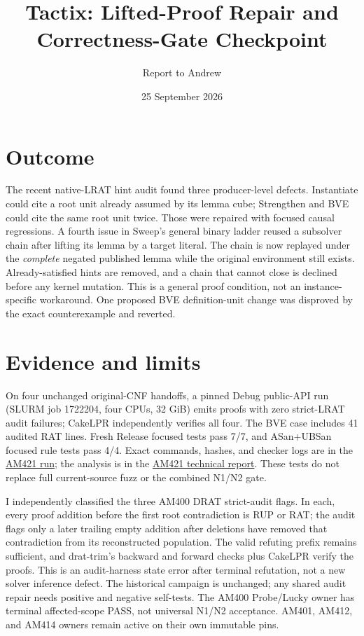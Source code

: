 \documentclass[11pt]{article}
\title{Tactix: Lifted-Proof Repair and Correctness-Gate Checkpoint}
\author{Report to Andrew}
\date{25 September 2026}
\begin{document}
\maketitle
\vspace{-1.5em}

\section*{Outcome}
The recent native-LRAT hint audit found three producer-level defects. Instantiate
could cite a root unit already assumed by its lemma cube; Strengthen and BVE
could cite the same root unit twice. Those were repaired with focused causal
regressions. A fourth issue in Sweep's general binary ladder reused a
subsolver chain after lifting its lemma by a target literal. The chain is now
replayed under the \emph{complete} negated published lemma while the original
environment still exists. Already-satisfied hints are removed, and a chain
that cannot close is declined before any kernel mutation. This is a general
proof condition, not an instance-specific workaround. One proposed BVE
definition-unit change was disproved by the exact counterexample and reverted.

\section*{Evidence and limits}
On four unchanged original-CNF handoffs, a pinned Debug public-API run (SLURM
job 1722204, four CPUs, 32 GiB) emits proofs with zero strict-LRAT audit
failures; CakeLPR independently verifies all four. The BVE case includes
41 audited RAT lines. Fresh Release focused tests pass 7/7, and ASan+UBSan
focused rule tests pass 4/4. Exact commands, hashes, and checker logs are in the
\href{../../benchmarks/runs/20260925-am421-final-hint-check/}{AM421 run}; the
analysis is in the \href{../../benchmarks/reports/2026-09-25-am421-lifted-lrat-and-drat-audit.md}{AM421 technical report}.
These tests do not replace full current-source fuzz or the combined N1/N2 gate.

I independently classified the three AM400 DRAT strict-audit flags. In each,
every proof addition before the first root contradiction is RUP or RAT; the
audit flags only a later trailing empty addition after deletions have removed
that contradiction from its reconstructed population. The valid refuting
prefix remains sufficient, and drat-trim's backward and forward checks plus
CakeLPR verify the proofs. This is an audit-harness state error after terminal
refutation, not a new solver inference defect. The historical campaign is
unchanged; any shared audit repair needs positive and negative self-tests.
The AM400 Probe/Lucky owner has terminal affected-scope PASS, not universal
N1/N2 acceptance. AM401, AM412, and AM414 owners remain active on their own
immutable pins.
\end{document}

